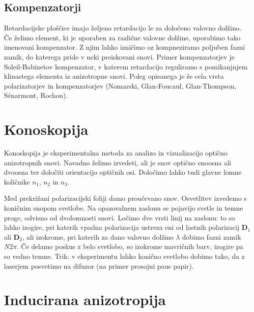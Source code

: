 \subsection*{Kompenzatorji}
Retardacijske ploščice imajo željeno retardacijo le za določeno valovno dolžino. Če 
želimo element, ki je uporaben za različne valovne dolžine, uporabimo tako imenovani
kompenzator. Z njim lahko izničimo oz kompneziramo poljuben fazni zamik, do katerega pride
v neki preiskovani snovi. Primer kompenzatorjev je Soleil-Babinetov kompenzator, v katerem
retardacijo reguliramo s pomikanjnjem klinastega elementa iz anizotropne snovi. Poleg opisanega
je še cela vrsta polarizatorjev in kompenzatorjev (Nomarski, Glan-Foucaul, Glan-Thompson, S{\'e}narmont, 
Rochon).

\section{Konoskopija}
Konoskopija je eksperimentalna metoda za analizo in vizualizacijo optično anizotropnih snovi. 
Navadno želimo izvedeti, ali je snov optično enoosna ali dvoosna ter določiti orientacijo 
optičnih osi. Določimo lahko tudi glavne lomne količnike $n_1$, $n_2$ in $n_3$. 

Med prekrižani polarizacijski foliji damo proučevano snov. Osvetlitev izvedemo s koničnim
snopom svetlobe. Na opazovalnem zaslonu se pojavijo svetle in temne proge, odvisno
od dvolomnosti snovi. Ločimo dve vrsti linij na zaslonu: to so lahko izogire, pri katerih vpadna
polarizacija ustreza eni od lastnih polarizacij $\mathbf{D}_1$ ali $\mathbf{D}_2$, ali
izokrome, pri katerih za dano valovno dolžino $\lambda$ dobimo fazni zamik $N2\pi$. 
Če delamo poskus z belo svetlobo, so izokrome mavričnih barv, izogire pa so vedno temne.
Trik: v eksperimentu lahko konično svetlobo dobimo tako, da z laserjem posvetimo
na difuzor (na primer prosojni paus papir).



\section{Inducirana anizotropija}
